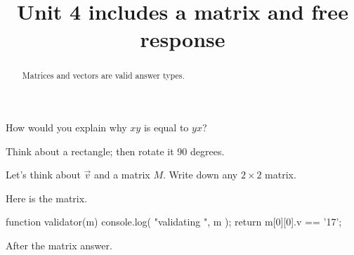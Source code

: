 \documentclass{ximera}
\title{Unit 4 includes a matrix and free response}
\begin{document}
\begin{abstract}
  Matrices and vectors are valid answer types.
\end{abstract}

How would you explain why $xy$ is equal to $yx$?
\begin{free-response}
  Think about a rectangle; then rotate it 90 degrees.
\end{free-response}

\begin{exercise}
  Let's think about $\vec{v}$ and a matrix $M$.  Write down any $2
  \times 2$ matrix.

\begin{solution}
  Here is the matrix.

\begin{matrix-answer}[name=M]
  function validator(m) {
    console.log( "validating ", m );
    return m[0][0].v == '17';
  }
\end{matrix-answer}

After the matrix answer.

\end{solution}

\end{exercise}
\end{document}
